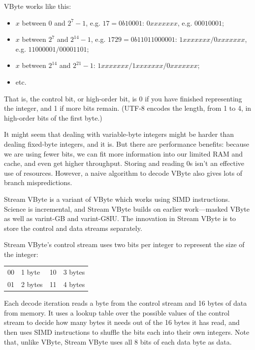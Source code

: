 \documentclass[a4paper]{report}
\begin{document}
VByte works like this:
\vspace*{-1em}
\begin{itemize}[noitemsep]
\item $x$ between 0 and $2^7-1$, e.g. $17 = 0b10001$: $0xxx xxxx$, e.g. $0001 0001$;
\item $x$ between $2^7$ and $2^{14}-1$, e.g. $1729 = 0b110 11000001$:
                   $1xxx xxxx/0xxx xxxx$, e.g. $1100 0001/0000 1101$;
\item $x$ between $2^{14}$ and $2^{21}-1$: $1xxx xxxx/1xxx xxxx/0xxx xxxx$;
\item etc.
\end{itemize}
That is, the control bit, or high-order bit, is 0 if you have finished representing the integer,
and 1 if more bits remain. (UTF-8 encodes the length, from 1 to 4, in high-order bits of the first byte.)

It might seem that dealing with variable-byte integers might be
harder than dealing fixed-byte integers, and it is. But there are performance benefits: because we are
using fewer bits, we can fit more information into our limited RAM and
cache, and even get higher throughput. Storing and reading 0s isn't an effective
use of resources. However, a naive algorithm to decode VByte also gives
lots of branch mispredictions.

Stream VByte is a variant of VByte which works using SIMD instructions.
Science is incremental, and Stream VByte builds on earlier work---masked VByte
as well as {\sc varint}-GB and {\sc varint}-G8IU. The innovation in
Stream VByte is to store the control and data streams separately.

Stream VByte's control stream uses two bits per integer to represent the size of the integer:
\begin{center}
\vspace*{-1em}
\begin{tabular}{ll@{~~~~~~~~}ll}
00 & 1 byte & 10 & 3 bytes\\
01 & 2 bytes & 11 & 4 bytes
\end{tabular}
\end{center}

Each decode iteration reads a byte from the control stream and 16 bytes of data from memory.
It uses a lookup table over the possible values of the control stream to decide how many
bytes it needs out of the 16 bytes it has read, and then uses SIMD instructions to shuffle
the bits each into their own integers. Note that, unlike VByte, Stream VByte uses all 8 bits
of each data byte as data.
\end{document}
